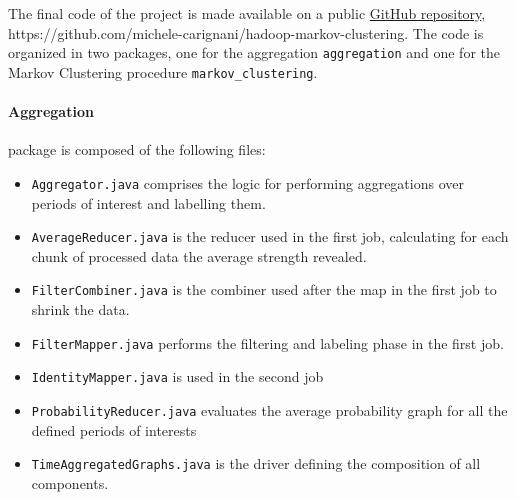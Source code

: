 The final code of the project is made available on a public \href{https://github.com/michele-carignani/hadoop-markov-clustering}{GitHub repository}, \\ https://github.com/michele-carignani/hadoop-markov-clustering.
The code is organized in two packages, one for the aggregation \texttt{aggregation} and one for the Markov Clustering procedure \texttt{markov\_clustering}.

\paragraph{Aggregation} package is composed of the following files:
\begin{itemize}
\item \texttt{Aggregator.java} comprises the logic for performing aggregations over periods of interest and labelling them.
\item \texttt{AverageReducer.java} is the reducer used in the first job, calculating for each chunk of processed data the average strength revealed.
\item \texttt{FilterCombiner.java} is the combiner used after the map in the first job to shrink the data.
\item \texttt{FilterMapper.java} performs the filtering and labeling phase in the first job.
\item \texttt{IdentityMapper.java} is used in the second job
\item \texttt{ProbabilityReducer.java} evaluates the average probability graph for all the defined periods of interests
\item \texttt{TimeAggregatedGraphs.java} is the driver defining the composition of all components.
\end{itemize}

